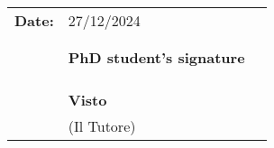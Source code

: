 \documentclass[12pt,a4paper,oneside]{extarticle}
\begin{document}
\begin{tabular}{p{3cm} p{7cm} p{3cm}}
    \textbf{Date:} &\hspace{-2cm} 27/12/2024 & \\
    &  &\\
    &  &\\
    & \hspace{1cm} \textbf{PhD student's signature} &\vspace{-6mm} \hspace{1cm} \underline{\hspace{5cm}} \\
    & &\\
    & &\\
    & &\\
    & \hspace{4.5cm} \textbf{Visto} & \vspace{-6mm} \hspace{1cm} \underline{\hspace{5cm}} \\
    & \hspace{4.1cm} \vspace{-1cm}(Il Tutore)  &\\
\end{tabular}






\end{document}
